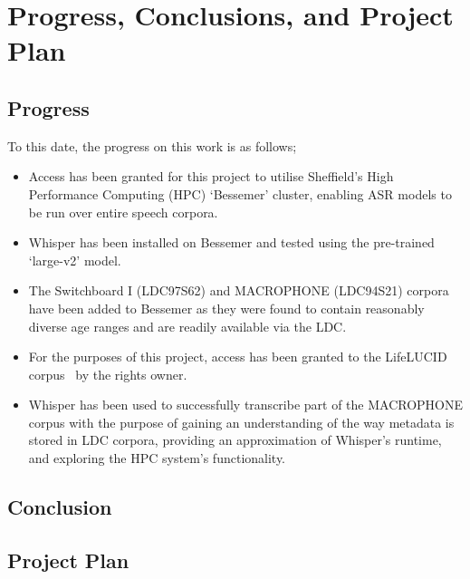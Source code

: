 \chapter{Progress, Conclusions, and Project Plan}\label{ch:conclusions-and-proj-plan}

\section{Progress}\label{sec:progress}

To this date, the progress on this work is as follows;

\begin{itemize}
    \item Access has been granted for this project to utilise Sheffield's High Performance
    Computing (HPC) `Bessemer' cluster, enabling ASR models to be run over entire speech corpora.
    \item Whisper\cite{whisper} has been installed on Bessemer and tested using the pre-trained
    `large-v2' model.
    \item The Switchboard I (LDC97S62)\cite{switchboard-ldc} and MACROPHONE
    (LDC94S21)\cite{macrophone} corpora have been added to Bessemer as they were found to
    contain reasonably diverse age ranges and are readily available via the LDC\@.
    \item For the purposes of this project, access has been granted to the LifeLUCID
    corpus~\cite{lifelucid} by the rights owner.
    \item Whisper has been used to successfully transcribe part of the MACROPHONE corpus with the
    purpose of gaining an understanding of the way metadata is stored in LDC corpora, providing an
    approximation of Whisper's runtime, and exploring the HPC system's functionality.
\end{itemize}

\section{Conclusion}\label{sec:conclusion}



\section{Project Plan}\label{sec:proj-plan}

